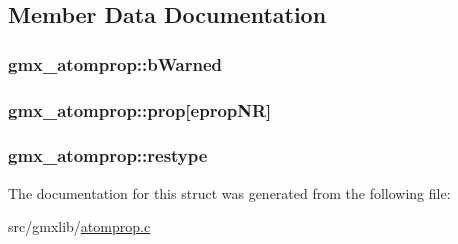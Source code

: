 \subsection{\-Member \-Data \-Documentation}
\hypertarget{structgmx__atomprop_aa8d80fb753991743f9a5db355ace7cc4}{
\subsubsection[{b\-Warned}]{ {\bf gmx\-\_\-atomprop\-::b\-Warned}}}\label{structgmx__atomprop_aa8d80fb753991743f9a5db355ace7cc4}
\hypertarget{structgmx__atomprop_acd01624cf85566e9d176ed11a6b929be}{
\subsubsection[{prop}]{ {\bf gmx\-\_\-atomprop\-::prop}\mbox{[}{\bf eprop\-N\-R}\mbox{]}}}\label{structgmx__atomprop_acd01624cf85566e9d176ed11a6b929be}
\hypertarget{structgmx__atomprop_aeee43f153c1eb94165656f476bfb243d}{
\subsubsection[{restype}]{ {\bf gmx\-\_\-atomprop\-::restype}}}\label{structgmx__atomprop_aeee43f153c1eb94165656f476bfb243d}


\-The documentation for this struct was generated from the following file\-:\begin{DoxyCompactItemize}
\item 
src/gmxlib/\hyperlink{atomprop_8c}{atomprop.\-c}\end{DoxyCompactItemize}
